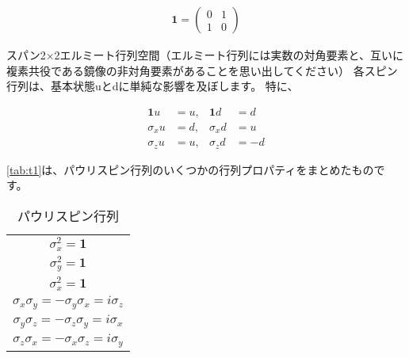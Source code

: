 \begin{align}
\mathbf{1} = 
\left( \begin{array}{ccc}
 0 & 1 \\
 1 & 0
\end{array} \right) 
\end{align}

スパン2×2エルミート行列空間（エルミート行列には実数の対角要素と、互いに複素共役である鏡像の非対角要素があることを思い出してください）
各スピン行列は、基本状態uとdに単純な影響を及ぼします。 特に、

\begin{align}
  \mathbf{1} u &= u, &\mathbf{1} d &= d \\
  \sigma_x u &= d, &\sigma_x d &= u \\
  \sigma_z u &= u, &\sigma_z d &= - d
\end{align}
 
\autoref{tab:t1}は、パウリスピン行列のいくつかの行列プロパティをまとめたものです。

\begin{table}[H]
\label{tab:t1}
\caption{パウリスピン行列}
\centering
\begin{tabular}{|c|} \hline
$\sigma_x^2 = \mathbf{1} $ \\ 
$\sigma_y^2 = \mathbf{1} $ \\
$\sigma_x^2 = \mathbf{1} $\\
$\sigma_x \sigma_y = - \sigma_y \sigma_x = i \sigma_z$ \\
$\sigma_y \sigma_z = - \sigma_z \sigma_y = i \sigma_x$ \\
$\sigma_z \sigma_x = - \sigma_x \sigma_z = i \sigma_y$ \\ \hline
\end{tabular}
\end{table}



